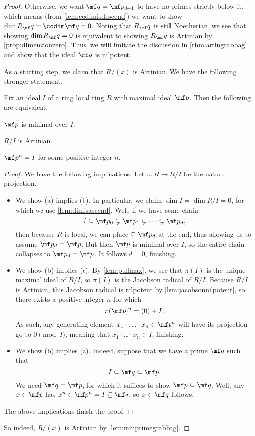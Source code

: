 \begin{proof}
	Otherwise, we want $\mf q=\mf p_{d-1}$ to have no primes strictly below it, which means (from \autoref{lem:codimisdescend}) we want to show $\dim R_\mf q=\codim\mf q=0$. Noting that $R_\mf q$ is still Noetherian, we see that showing $\dim R_\mf q=0$ is equivalent to showing $R_\mf q$ is Artinian by \autoref{prop:dimenzionzero}. Thus, we will imitate the discussion in \autoref{thm:artingrabbag} and show that the ideal $\mf q$ is nilpotent.

	As a starting step, we claim that $R/(x)$ is Artinian. We have the following stronger statement.
	\begin{lemma} \label{lem:minprimegrabbag}
		Fix an ideal $I$ of a ring local ring $R$ with maximal ideal $\mf p$. Then the following are equivalent.
		\begin{listalph}
			\item $\mf p$ is minimal over $I$.
			\item $R/I$ is Artinian.
			\item $\mf p^n=I$ for some positive integer $n$.
		\end{listalph}
	\end{lemma}
	\begin{proof}
		We have the following implications. Let $\pi:R\to R/I$ be the natural projection.
		\begin{itemize}
			\item We show (a) implies (b). In particular, we claim $\dim I=\dim R/I=0$, for which we use \autoref{lem:dimisascend}. Well, if we have some chain
			\[I\subseteq\mf p_0\subsetneq\mf p_1\subsetneq\cdots\subsetneq\mf p_d,\]
			then because $R$ is local, we can place $\subseteq\mf p_d$ at the end, thus allowing us to assume $\mf p_d=\mf p$. But then $\mf p$ is minimal over $I$, so the entire chain collapses to $\mf p_0=\mf p$. It follows $d=0$, finishing.
			\item We show (b) implies (c). By \autoref{lem:pullmax}, we see that $\pi(I)$ is the unique maximal ideal of $R/I$, so $\pi(I)$ is the Jacobson radical of $R/I$. Because $R/I$ is Artinian, this Jacobson radical is nilpotent by \autoref{lem:jacobsonnilpotent}, so there exists a positive integer $n$ for which
			\[\pi(\mf p)^n=(0)+I.\]
			As such, any generating element $x_1\cdot\ldots\cdot x_n\in\mf p^n$ will have its projection go to $0\pmod I$, meaning that $x_1\cdot\ldots\cdot x_n\in I$, finishing.
			\item We show (b) implies (a). Indeed, suppose that we have a prime $\mf q$ such that
			\[I\subseteq\mf q\subseteq\mf p.\]
			We need $\mf q=\mf p$, for which it suffices to show $\mf p\subseteq\mf q$. Well, any $x\in\mf p$ has $x^n\in\mf p^n=I\subseteq\mf q$, so $x\in\mf q$ follows.
		\end{itemize}
		The above implications finish the proof.
	\end{proof}
	So indeed, $R/(x)$ is Artinian by \autoref{lem:minprimegrabbag}.


\end{proof}
